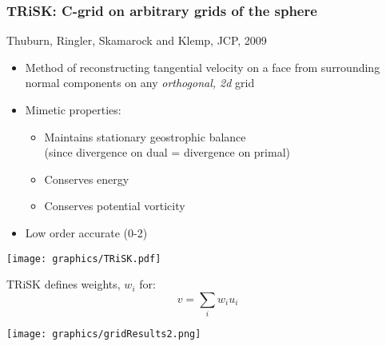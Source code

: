  
\makeatletter{}\begin{frame}
\frametitle{TRiSK: C-grid on arbitrary grids of the sphere}

Thuburn, Ringler, Skamarock and Klemp, JCP, 2009

\begin{itemize}
\item Method of reconstructing tangential velocity on a face from surrounding normal components on any {\em\color{magenta} orthogonal, 2d} grid
\item Mimetic properties:
    \begin{itemize}
    \item Maintains stationary geostrophic balance\\
        (since divergence on dual = divergence on primal)
    \item Conserves energy
    \item Conserves potential vorticity
    \end{itemize}
\item Low order accurate (0-2)
\end{itemize}

\begin{minipage}{0.4\linewidth}
\texttt{[image: graphics/TRiSK.pdf]}
\end{minipage}
\begin{minipage}{0.49\linewidth}\centering
TRiSK defines weights, $w_i$ for:
\[v = \sum_i w_i u_i\]
\end{minipage}
\end{frame}

 
\makeatletter{}\begin{frame}
\texttt{[image: graphics/gridResults2.png]}
\end{frame}
 

